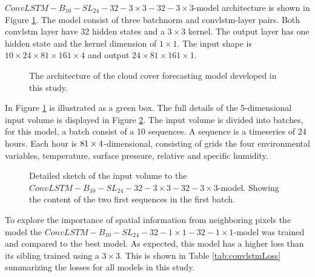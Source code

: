 $ConvLSTM-B_{10}-SL_{24}-32-3\times3-32-3 \times3$-model architecture is shown in Figure \ref{fig:best_ml_architecture}. The model consist of three \acrshort{batchnorm} and  \acrshort{convlstm}-layer pairs. Both \acrshort{convlstm} layer have 32 hidden states and a $3\times 3$ kernel. The output layer has one hidden state and the kernel dimension of $1\times 1$. The input shape is $10\times24\times81\times161\times4$ and output $24\times81\times161\times1$. 
\begin{figure}
    \centering
    
    \caption{The architecture of the cloud cover forecasting model developed in this study. }
    \label{fig:best_ml_architecture}
\end{figure}
In Figure \ref{fig:best_ml_architecture} is illustrated as a green box. The full details of the 5-dimensional input volume is displayed in Figure \ref{fig:input_volume_conv_lstm}. The input volume is divided into batches, for this model, a batch consist of a 10 sequences. A sequence is a timeseries of 24 hours. Each hour is $81\time161\times4$-dimensional, consisting of grids the four environmental variables, temperature, surface pressure, relative and specific humidity. 

\begin{figure}
    \centering
    
    \caption{Detailed sketch of the input volume to the $ConvLSTM-B_{10}-SL_{24}-32-3\times3-32-3 \times3$-model. Showing the content of the two first sequences in the first batch.}
    \label{fig:input_volume_conv_lstm}
\end{figure}

To explore the importance of spatial information from neighboring pixels the model the $ConvLSTM-B_{10}-SL_{24}-32-1\times1-32-1 \times1$-model was trained and compared to the best model. %
As expected, this model has a higher loss than its sibling trained using a $3\times 3$. This is shown in Table \ref{tab:convlstmLoss} summarizing the losses for all models in this study.
\cleardoublepage

